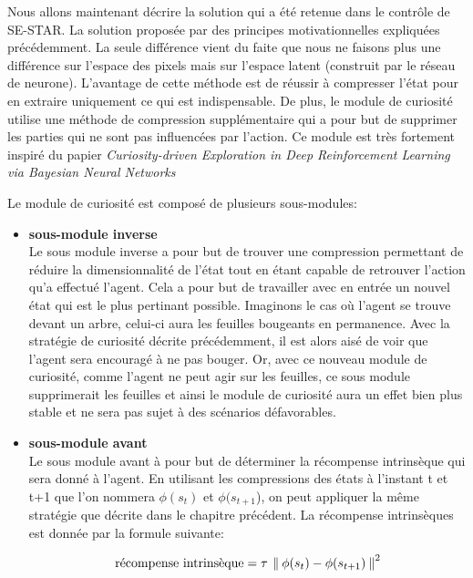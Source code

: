 Nous allons maintenant décrire la solution qui a été retenue dans le contrôle de SE-STAR. La solution proposée par des principes motivationnelles expliquées précédemment. La seule différence vient du faite que nous ne faisons plus une différence sur l'espace des pixels mais sur l'espace latent (construit par le réseau de neurone). L'avantage de cette méthode est de réussir à compresser l'état pour en extraire uniquement ce qui est indispensable. De plus, le module de curiosité utilise une méthode de compression supplémentaire qui a pour but de supprimer les parties qui ne sont pas influencées par l'action. Ce module est très fortement inspiré du papier \emph{Curiosity-driven Exploration in Deep Reinforcement Learning via Bayesian Neural Networks}\cite{curiositydriven}


Le module de curiosité est composé de plusieurs sous-modules:

\begin{itemize}
    \item \textbf{sous-module inverse}\\
        Le sous module inverse a pour but de trouver une compression permettant de réduire la dimensionnalité de l'état tout en étant capable de retrouver l'action qu'a effectué l'agent. Cela a pour but de travailler avec en entrée un nouvel état qui est le plus pertinant possible. Imaginons le cas où l'agent se trouve devant un arbre, celui-ci aura les feuilles bougeants en permanence. Avec la stratégie de curiosité décrite précédemment, il est alors aisé de voir que l'agent sera encouragé à ne pas bouger. Or, avec ce nouveau module de curiosité, comme l'agent ne peut agir sur les feuilles, ce sous module supprimerait les feuilles et ainsi le module de curiosité aura un effet bien plus stable et ne sera pas sujet à des scénarios défavorables.
    \item \textbf{sous-module avant}\\
        Le sous module avant à pour but de déterminer la récompense intrinsèque qui sera donné à l'agent.
        En utilisant les compressions des états à l'instant t et t+1 que l'on nommera $\phi(s_t)$ et $\phi(s_{t+1}$), on peut appliquer la même stratégie que décrite dans le chapitre précédent. La récompense intrinsèques est donnée par la formule suivante:

\begin{equation}\label{eqn:hierarchicalcuriosity}
    \text{récompense intrinsèque} = \tau\: \left\lVert\:  \phi(s_t) - \phi(s_{t+1})  \:\right\rVert^2 
\end{equation}

\end{itemize}

